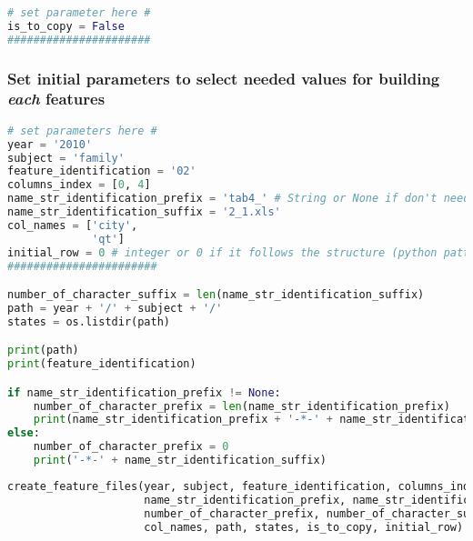 \begin{lstlisting}[language=Python]
# set parameter here #
is_to_copy = False
######################
\end{lstlisting}

\subsubsection{\texorpdfstring{Set initial parameters to select needed
values for building \emph{each}
features}{Set initial parameters to select needed values for building each features}}\label{set-initial-parameters-to-select-needed-values-for-building-each-features}

\begin{lstlisting}[language=Python]
# set parameters here #
year = '2010'
subject = 'family'
feature_identification = '02'
columns_index = [0, 4]
name_str_identification_prefix = 'tab4_' # String or None if don't need a suffix to search
name_str_identification_suffix = '2_1.xls'
col_names = ['city',
             'qt']
initial_row = 0 # integer or 0 if it follows the structure (python pattern)
#######################

number_of_character_suffix = len(name_str_identification_suffix)
path = year + '/' + subject + '/'
states = os.listdir(path)

print(path)
print(feature_identification)

if name_str_identification_prefix != None:
    number_of_character_prefix = len(name_str_identification_prefix)
    print(name_str_identification_prefix + '-*-' + name_str_identification_suffix)
else:
    number_of_character_prefix = 0
    print('-*-' + name_str_identification_suffix)
\end{lstlisting}

\begin{lstlisting}[language=Python]
create_feature_files(year, subject, feature_identification, columns_index, 
                     name_str_identification_prefix, name_str_identification_suffix,
                     number_of_character_prefix, number_of_character_suffix,
                     col_names, path, states, is_to_copy, initial_row)
\end{lstlisting}
